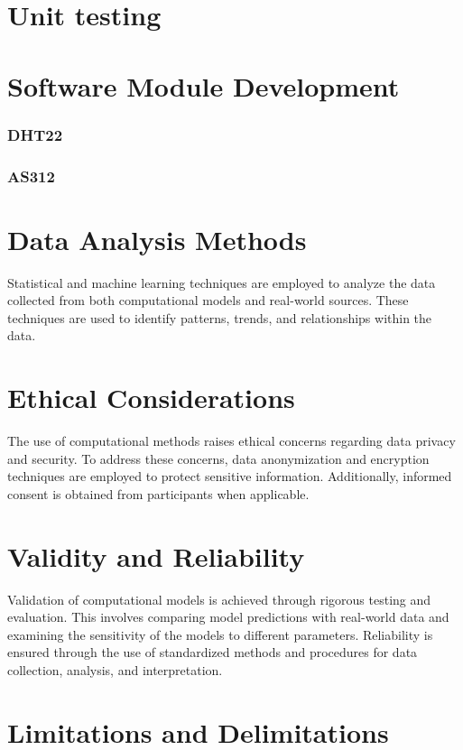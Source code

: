 \section{Unit testing}

\section{Software Module Development}
\subsubsection{DHT22}

\subsubsection{AS312}
\section{Data Analysis Methods}

Statistical and machine learning techniques are employed to analyze the data collected from both computational models and real-world sources. These techniques are used to identify patterns, trends, and relationships within the data.

\section{Ethical Considerations}

The use of computational methods raises ethical concerns regarding data privacy and security. To address these concerns, data anonymization and encryption techniques are employed to protect sensitive information. Additionally, informed consent is obtained from participants when applicable.

\section{Validity and Reliability}

Validation of computational models is achieved through rigorous testing and evaluation. This involves comparing model predictions with real-world data and examining the sensitivity of the models to different parameters. Reliability is ensured through the use of standardized methods and procedures for data collection, analysis, and interpretation.

\section{Limitations and Delimitations}

